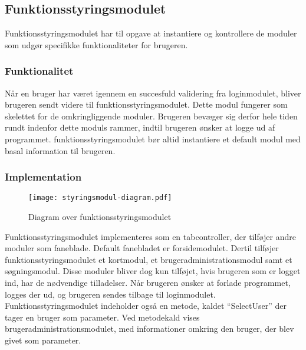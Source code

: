 \subsection{Funktionsstyringsmodulet}
\label{sub:styringsmodul}

Funktionsstyringsmodulet har til opgave at instantiere og kontrollere de moduler som udgør specifikke funktionaliteter for brugeren.

\subsubsection{Funktionalitet}
\label{ssub:hovedmodul_funktionalitet}

Når en bruger har været igennem en succesfuld validering fra loginmodulet, bliver brugeren sendt videre til funktionsstyringsmodulet. Dette modul fungerer som skelettet for de omkringliggende moduler. Brugeren bevæger sig derfor hele tiden rundt indenfor dette moduls rammer, indtil brugeren ønsker at logge ud af programmet. funktionsstyringsmodulet bør altid instantiere et default modul med basal information til brugeren.

\subsubsection{Implementation}
\label{ssub:hovedmodul_implementation}

\begin{figure}
  \centering
  \texttt{[image: styringsmodul-diagram.pdf]}
  \caption{Diagram over funktionsstyringsmodulet}
\end{figure}

Funktionsstyringsmodulet implementeres som en tabcontroller, der tilføjer andre moduler som faneblade. Default fanebladet er forsidemodulet. Dertil tilføjer funktionsstyringsmodulet et kortmodul, et brugeradministrationsmodul samt et søgningsmodul. Disse moduler bliver dog kun tilføjet, hvis brugeren som er logget ind, har de nødvendige tilladelser. Når brugeren ønsker at forlade programmet, logges der ud, og brugeren sendes tilbage til loginmodulet. Funktionsstyringsmodulet indeholder også en metode, kaldet \enquote{SelectUser} der tager en bruger som parameter. Ved metodekald vises brugeradministrationsmodulet, med informationer omkring den bruger, der blev givet som parameter. 